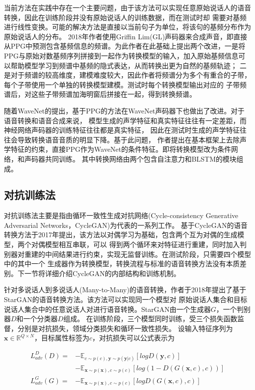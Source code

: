 当前方法在实践中存在一个主要问题，由于该方法可以实现任意原始说话人的语音转换，因此在训练阶段并没有原始说话人的训练数据，而在测试时却
需要对基频进行线性变换。可能的解决方法是直接以当前句子为单位，将该句的基频分布作为原始说话人的分布。
2018年作者使用Griffin Lim(GL)声码器来合成声音，即直接从PPG中预测包含基频信息的频谱。为此作者在此基础上提出两个改进，一是将
PPG与原始对数基频序列拼接到一起作为转换模型的输入，加入原始基频信息可以帮助模型学习到频谱中基频的隐式表达，从而转换出更为自然的基频轨迹；
二是对于频谱的较高维度，建模难度较大，因此作者将频谱分为多个有重合的子带，每个子带使用一个单独的转换模型建模。测试时每个转换模型输出对应的
子带频谱后，对这些子带频谱加海明窗后拼接在一起，得到转换频谱。

随着WaveNet的提出，基于PPG的方法在WaveNet声码器下也做出了改进。对于语音转换和语音合成来说，
模型生成的声学特征和真实特征往往有一定差距，而神经网络声码器的训练特征往往都是真实特征，
因此在测试时生成的声学特征往往会导致转换语音音质的明显下降。基于此问题，
作者提出在基本框架上去除声学特征的约束，直接PPG作为WaveNet的条件特征。即将转换模型改为条件网络，和声码器共同训练。
其中转换网络由两个包含自注意力和BLSTM的模块组成。




\subsection{对抗训练法}
对抗训练法主要是指由循环一致性生成对抗网络(Cycle-consistency Generative Adversarial Networks，CycleGAN)为代表的一系列工作。
基于CycleGAN的语音转换方法于2017年提出，该方法以对偶学习为基础，包含两个互为对偶的生成模型，两个对偶模型相互串联，可以
得到两个循环来对特征进行重建，同时加入判别器对重建的中间结果进行约束，实现无监督训练。在测试阶段，只需要四个模型中的其中一个
生成器作为转换模型，转换流程与标准的语音转换方法没有本质差别。下一节将详细介绍CycleGAN的内部结构和训练机制。

针对多说话人到多说话人(Many-to-Many)的语音转换，作者于2018年提出了基于StarGAN的语音转换方法。该方法可以实现同一个模型对
原始说话人集合和目标说话人集合中的任意说话人对进行语音转换。StarGAN由一个生成器$G$，一个判别器$D$和一个分类器$D$组成。
在训练阶段，三个模型同时训练，受三个损失函数监督，分别是对抗损失，领域分类损失和循环一致性损失。
设输入特征序列为$\mathbf{x}\in \mathbb{R}^{Q\times N}$，目标属性标签为$c$，对抗损失可以公式表示为

\begin{align}
    L^D_{adv}(D) = & -\mathbb{E}_{c\sim p(c),\mathbf{y}\sim p(\mathbf{y}|c)}\left[ log D(\mathbf{y}, c) \right] \\
                   & -\mathbb{E}_{\mathbf{x}\sim p(\mathbf{x}),c\sim p(c)}\left[ log(1-D(G(\mathbf{x},c),c)) \right] \\
    L^G_{adv}(G) = & -\mathbb{E}_{\mathbf{x}\sim p(\mathbf{x}),c\sim p(c)}\left[ log D(G(\mathbf{x},c),c) \right]
\end{align}

